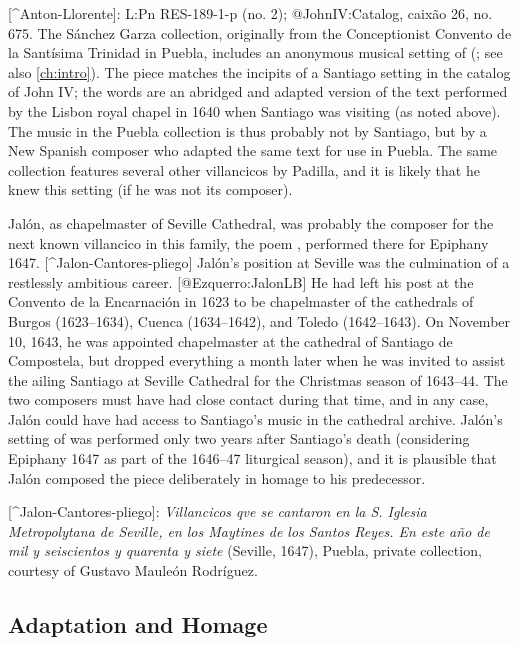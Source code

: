[^Anton-Llorente]:
L:Pn RES-189-1-p (no. 2); @JohnIV:Catalog, caixão 26, no. 675.
The Sánchez Garza collection, originally from the Conceptionist Convento de la
Santísima Trinidad in Puebla, includes an anonymous musical setting of  (; see also \cref{ch:intro}).
The piece matches the incipits of a Santiago setting in the catalog of John IV;
the words are an abridged and adapted version of the text performed by the
Lisbon royal chapel in 1640 when Santiago was visiting (as noted above).
The music in the Puebla collection is thus probably not by Santiago, but by a
New Spanish composer who adapted the same text for use in Puebla.
The same collection features several other villancicos by Padilla, and it is
likely that he knew this setting (if he was not its composer).



Jalón, as chapelmaster of Seville Cathedral, was probably the composer for the
next known villancico in this family, the poem ,
performed there for Epiphany 1647.
[^Jalon-Cantores-pliego]
Jalón's position at Seville was the culmination of a restlessly ambitious
career.
[@Ezquerro:JalonLB]
He had left his post at the Convento de la Encarnación in 1623 to be
chapelmaster of the cathedrals of Burgos (1623--1634), Cuenca (1634--1642), and
Toledo (1642--1643).
On November 10, 1643, he was appointed chapelmaster at the cathedral of Santiago
de Compostela, but dropped everything a month later when he was invited to
assist the ailing Santiago at Seville Cathedral for the Christmas season of
1643--44.
The two composers must have had close contact during that time, and in any case,
Jalón could have had access to Santiago's music in the cathedral archive.
Jalón's setting of  was performed only two years after Santiago's
death (considering Epiphany 1647 as part of the 1646--47 liturgical season), and
it is plausible that Jalón composed the piece deliberately in homage to his
predecessor.

[^Jalon-Cantores-pliego]:
\emph{Villancicos qve se cantaron en la S. Iglesia Metropolytana de Seville, en los
Maytines de los Santos Reyes.
En este año de mil y seiscientos y quarenta y siete} (Seville, 1647), Puebla,
private collection, courtesy of Gustavo Mauleón Rodríguez.

\subsection{Adaptation and Homage}

